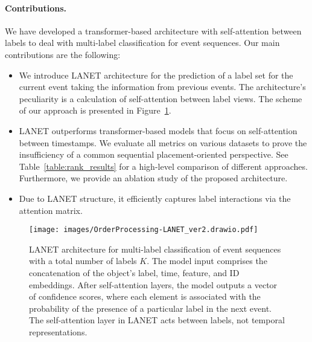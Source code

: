 \documentclass[runningheads]{llncs}
\begin{document}
\paragraph{\textbf{Contributions.}}
We have developed a transformer-based architecture with self-attention between labels to deal with multi-label classification for event sequences. Our main contributions are the following:
\begin{itemize}
    \item We introduce LANET architecture for the prediction of a label set for the current event taking the information from previous events. The architecture's peculiarity is a calculation of self-attention between label views. The scheme of our approach is presented in Figure~\ref{fig:transf}.
    \item LANET outperforms transformer-based models that focus on self-attention between timestamps. We evaluate all metrics on various datasets to prove the insufficiency of a common sequential placement-oriented perspective. See Table~\ref{table:rank_results} for a high-level comparison of different approaches. Furthermore, we provide an ablation study of the proposed architecture. 
    \item Due to LANET structure, it efficiently captures label interactions via the attention matrix. 
\end{itemize}

\begin{figure}[h!]
    \centering
    \texttt{[image: images/OrderProcessing-LANET\_ver2.drawio.pdf]}
    \caption{LANET architecture for multi-label classification of event sequences with a total number of labels $K$. The model input comprises the concatenation of the object's label, time, feature, and ID embeddings. After self-attention layers, the model outputs a vector of confidence scores, where each element is associated with the probability of the presence of a particular label in the next event. The self-attention layer in LANET acts between labels, not temporal representations.}
    \label{fig:transf}
\end{figure}
\end{document}
